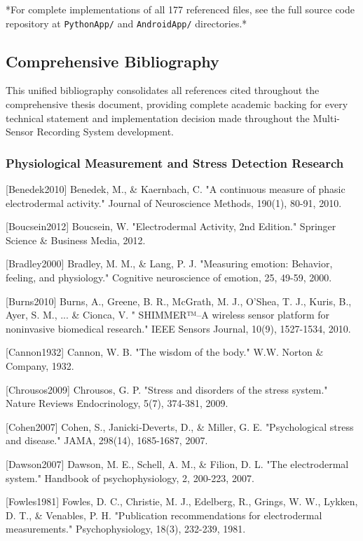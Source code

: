 \documentclass[11pt,a4paper]{report}
\begin{document}
{{*For complete implementations of all 177 referenced files, see the full source code repository at \texttt{PythonApp/}
and \texttt{AndroidApp/} directories.*

\subsection{Comprehensive Bibliography}

This unified bibliography consolidates all references cited throughout the comprehensive thesis document, providing
complete academic backing for every technical statement and implementation decision made throughout the Multi-Sensor
Recording System development.

\subsubsection{Physiological Measurement and Stress Detection Research}

[Benedek2010] Benedek, M., \& Kaernbach, C. "A continuous measure of phasic electrodermal activity." Journal of
Neuroscience Methods, 190(1), 80-91, 2010.

[Boucsein2012] Boucsein, W. "Electrodermal Activity, 2nd Edition." Springer Science \& Business Media, 2012.

[Bradley2000] Bradley, M. M., \& Lang, P. J. "Measuring emotion: Behavior, feeling, and physiology." Cognitive
neuroscience of emotion, 25, 49-59, 2000.

[Burns2010] Burns, A., Greene, B. R., McGrath, M. J., O'Shea, T. J., Kuris, B., Ayer, S. M., ... \& Cionca, V. "
SHIMMER™–A wireless sensor platform for noninvasive biomedical research." IEEE Sensors Journal, 10(9), 1527-1534, 2010.

[Cannon1932] Cannon, W. B. "The wisdom of the body." W.W. Norton \& Company, 1932.

[Chrousos2009] Chrousos, G. P. "Stress and disorders of the stress system." Nature Reviews Endocrinology, 5(7), 374-381,
2009.

[Cohen2007] Cohen, S., Janicki‐Deverts, D., \& Miller, G. E. "Psychological stress and disease." JAMA, 298(14),
1685-1687, 2007.

[Dawson2007] Dawson, M. E., Schell, A. M., \& Filion, D. L. "The electrodermal system." Handbook of psychophysiology, 2,
200-223, 2007.

[Fowles1981] Fowles, D. C., Christie, M. J., Edelberg, R., Grings, W. W., Lykken, D. T., \& Venables, P. H. "Publication
recommendations for electrodermal measurements." Psychophysiology, 18(3), 232-239, 1981.

}}
\end{document}
